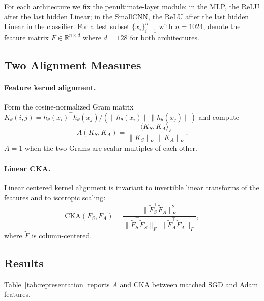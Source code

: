 For each architecture we fix the penultimate-layer module: in the MLP, the ReLU after the last hidden Linear; in the SmallCNN, the ReLU after the last hidden Linear in the classifier. For a test subset $\{x_i\}_{i=1}^n$ with $n=1024$, denote the feature matrix $F\in\mathbb{R}^{n\times d}$ where $d=128$ for both architectures.

\subsection{Two Alignment Measures}

\paragraph{Feature kernel alignment.} Form the cosine-normalized Gram matrix $K_\theta(i,j) = h_\theta(x_i)^\top h_\theta(x_j) / (\|h_\theta(x_i)\|\|h_\theta(x_j)\|)$ and compute
\[
A(K_S,K_A) = \frac{\langle K_S, K_A\rangle_F}{\|K_S\|_F\,\|K_A\|_F}.
\]
$A=1$ when the two Grams are scalar multiples of each other.

\paragraph{Linear CKA.} Linear centered kernel alignment \cite{kornblith2019similarity} is invariant to invertible linear transforms of the features and to isotropic scaling:
\[
\mathrm{CKA}(F_S,F_A) = \frac{\|\tilde F_S^\top \tilde F_A\|_F^2}{\|\tilde F_S^\top \tilde F_S\|_F\,\|\tilde F_A^\top \tilde F_A\|_F},
\]
where $\tilde F$ is column-centered.

\subsection{Results}

Table~\ref{tab:representation} reports $A$ and CKA between matched SGD and Adam features.

